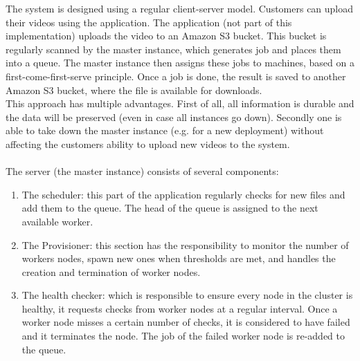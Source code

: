 \documentclass[a4paper]{IEEEtran}
\begin{document}
The system is designed using a regular client-server model.
Customers can upload their videos using the application.
The application (not part of this implementation) uploads the video to an Amazon S3 bucket.
This bucket is regularly scanned by the master instance, which generates job and places them into a queue.
The master instance then assigns these jobs to machines, based on a first-come-first-serve principle.
Once a job is done, the result is saved to another Amazon S3 bucket, where the file is available for downloads.
\\
This approach has multiple advantages.
First of all, all information is durable and the data will be preserved (even in case all instances go down).
Secondly one is able to take down the master instance (e.g. for a new deployment) without affecting the customers ability to upload new videos to the system.
\\
\\
The server (the master instance) consists of several components:

\begin{enumerate}
\item
The scheduler:
this part of the application regularly checks for new files and add them to the queue.
The head of the queue is assigned to the next available worker.
\item
The Provisioner:
this section has the responsibility to monitor the number of workers nodes, spawn new ones when thresholds are met, and handles the creation and termination of worker nodes.
\item
The health checker:
which is responsible to ensure every node in the cluster is healthy, it requests checks from worker nodes at a regular interval.
Once a worker node misses a certain number of checks, it is considered to have failed and it terminates the node.
The job of the failed worker node is re-added to the queue.
\end{enumerate}
\end{document}
